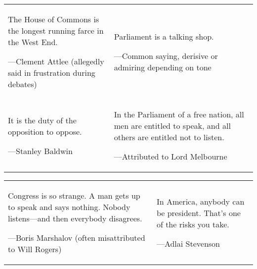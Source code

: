 \begin{table}[H]
\centering
\small
\begin{tabular}{p{}p{}}
\epigraph{The House of Commons is the longest running farce in the West End.}{---Clement Attlee (allegedly said in frustration during debates)} &
\epigraph{Parliament is a talking shop.}{---Common saying, derisive or admiring depending on tone} \\
\epigraph{It is the duty of the opposition to oppose.}{---Stanley Baldwin} &
\epigraph{In the Parliament of a free nation, all men are entitled to speak, and all others are entitled not to listen.}{---Attributed to Lord Melbourne} \\
\end{tabular}
\end{table}

\begin{table}[H]
\centering
\small
\begin{tabular}{p{}p{}}
\epigraph{Congress is so strange. A man gets up to speak and says nothing. Nobody listens—and then everybody disagrees.}{---Boris Marshalov (often misattributed to Will Rogers)} &
\epigraph{In America, anybody can be president. That's one of the risks you take.}{---Adlai Stevenson} \\
\end{tabular}
\end{table}

